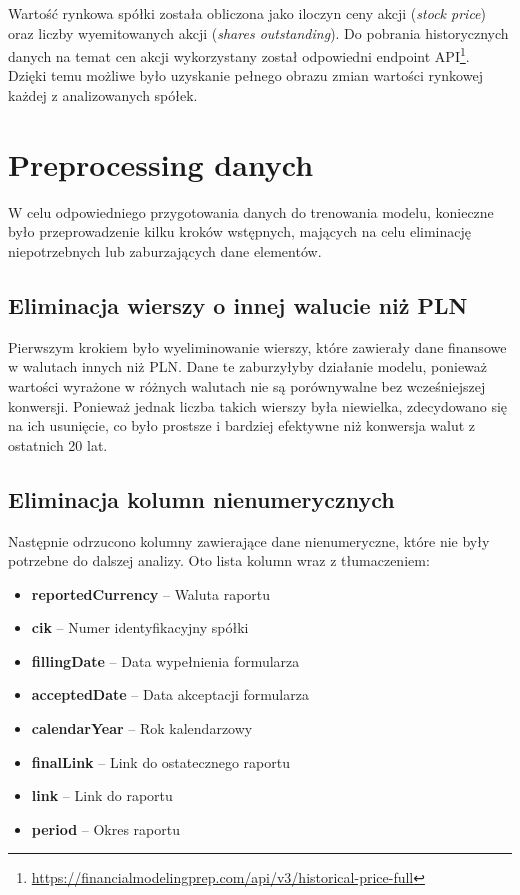 \documentclass[12pt]{article}
\begin{document}
Wartość rynkowa spółki została obliczona jako iloczyn ceny akcji (\emph{stock price}) oraz liczby wyemitowanych akcji (\emph{shares outstanding}). Do pobrania historycznych danych na temat cen akcji wykorzystany został odpowiedni endpoint API\footnote{\url{https://financialmodelingprep.com/api/v3/historical-price-full}}. Dzięki temu możliwe było uzyskanie pełnego obrazu zmian wartości rynkowej każdej z analizowanych spółek.

\newpage %
\section{Preprocessing danych}

W celu odpowiedniego przygotowania danych do trenowania modelu, konieczne było przeprowadzenie kilku kroków wstępnych, mających na celu eliminację niepotrzebnych lub zaburzających dane elementów.

\subsection{Eliminacja wierszy o innej walucie niż PLN}

Pierwszym krokiem było wyeliminowanie wierszy, które zawierały dane finansowe w walutach innych niż PLN. Dane te zaburzyłyby działanie modelu, ponieważ wartości wyrażone w różnych walutach nie są porównywalne bez wcześniejszej konwersji. Ponieważ jednak liczba takich wierszy była niewielka, zdecydowano się na ich usunięcie, co było prostsze i bardziej efektywne niż konwersja walut z ostatnich 20 lat.

\subsection{Eliminacja kolumn nienumerycznych}

Następnie odrzucono kolumny zawierające dane nienumeryczne, które nie były potrzebne do dalszej analizy. Oto lista kolumn wraz z tłumaczeniem:
\begin{itemize}
    \item \textbf{reportedCurrency} – Waluta raportu
    \item \textbf{cik} – Numer identyfikacyjny spółki
    \item \textbf{fillingDate} – Data wypełnienia formularza
    \item \textbf{acceptedDate} – Data akceptacji formularza
    \item \textbf{calendarYear} – Rok kalendarzowy
    \item \textbf{finalLink} – Link do ostatecznego raportu
    \item \textbf{link} – Link do raportu
    \item \textbf{period} – Okres raportu
\end{itemize}
\end{document}
